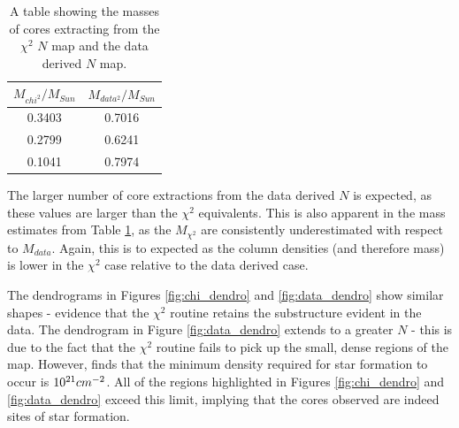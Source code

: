 \documentclass{report}
\begin{document}
\begin{table}[h]
  \centering
   \begin{tabular}{||c c||}
   \hline
   $M_{chi^{2}}/M_{Sun}$ & $M_{data^{2}}/M_{Sun}$ \\ [0.5ex]
   \hline\hline
   0.3403    & 0.7016     \\
   \hline
   0.2799  & 0.6241 \\
   \hline
   0.1041  & 0.7974 \\ [1ex]
   \end{tabular}
   \caption{A table showing the masses of cores extracting from the $\chi^{2}$ $N$ map and the data derived $N$ map.}
   \label{table:mass}
\end{table}

The larger number of core extractions from the data derived $N$ is expected, as these values are larger than the $\chi^{2}$ equivalents. This is also apparent in the mass estimates from Table \ref{table:mass}, as the $M_{\chi^{2}}$ are consistently underestimated with respect to $M_{data}$. Again, this is to expected as the column densities (and therefore mass) is lower in the $\chi^{2}$ case relative to the data derived case.

The dendrograms in Figures \ref{fig:chi_dendro} and \ref{fig:data_dendro} show similar shapes - evidence that the $\chi^{2}$ routine retains the substructure evident in the data. The dendrogram in Figure
\ref{fig:data_dendro} extends to a greater $N$ - this is due to the fact that the $\chi^{2}$ routine fails to pick up the small, dense regions of the map. However, \textcite{coldensity} finds that the minimum density required for star formation to occur is $10^{21}\/cm^{-2}$. All of the regions highlighted in Figures \ref{fig:chi_dendro} and \ref{fig:data_dendro} exceed this limit, implying that the cores observed are indeed sites of star formation.

\end{document}
